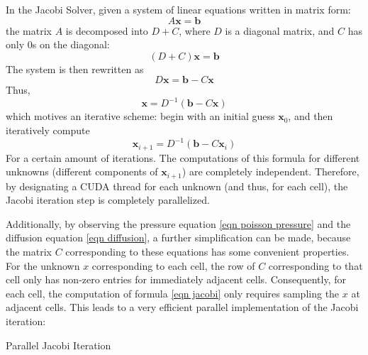In the Jacobi Solver, given a system of linear equations written in matrix form:
$$
A\textbf{x}=\textbf{b}
$$
the matrix $A$ is decomposed into $D+C$, where $D$ is a diagonal matrix, and $C$ has only $0$s on the diagonal:
$$
(D+C)\textbf{x}=\textbf{b}
$$
The system is then rewritten as 
$$
D\textbf{x}=\textbf{b} - C\textbf{x}
$$
Thus,
$$
\textbf{x}=D^{-1}(\textbf{b} - C\textbf{x})
$$
which motives an iterative scheme: begin with an initial guess $\textbf{x}_0$, and then iteratively compute
\begin{equation}
    \textbf{x}_{i+1} = D^{-1}(\textbf{b} - C\textbf{x}_{i})
    \label{eqn jacobi}
\end{equation}
For a certain amount of iterations. The computations of this formula for different unknowns (different components of $\textbf{x}_{i+1}$) are completely independent. Therefore, by designating a CUDA thread for each unknown (and thus, for each cell), the Jacobi iteration step is completely parallelized.

Additionally, by observing the pressure equation \ref{eqn poisson pressure} and the diffusion equation \ref{eqn diffusion}, a further simplification can be made, because the matrix $C$ corresponding to these equations has some convenient properties. For the unknown $x$ corresponding to each cell, the row of $C$ corresponding to that cell only has non-zero entries for immediately adjacent cells. Consequently, for each cell, the computation of formula \ref{eqn jacobi} only requires sampling the $x$ at adjacent cells. This leads to a very efficient parallel implementation of the Jacobi iteration:


\begin{algorithm}[H]
    \label{algo jacobi}
    \SetAlgoLined
    
    
    \caption{Parallel Jacobi Iteration}
\end{algorithm}

